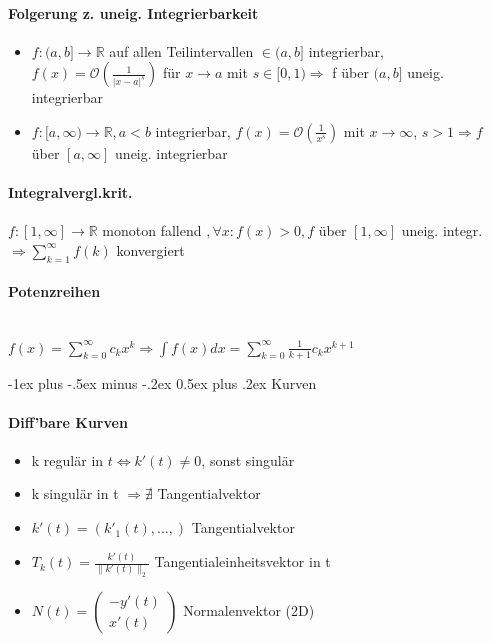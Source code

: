\documentclass[paper=a3,paper=landscape, fontsize=9pt, DIV=30]{scrartcl}
\makeatletter
\newcommand{\real}{{\mathbb{R}}}
\newcommand{\laO}{\mathcal{O}}
\renewcommand{\section}{\@startsection{section}{1}{0mm}%
  {-1ex plus -.5ex minus -.2ex}%
  {0.5ex plus .2ex}%
  {\color{blue}\normalfont\large\bfseries}}
\makeatother
\begin{document}
\begin{multicols*}{4}
	\paragraph{Folgerung z. uneig. Integrierbarkeit}
	\begin{itemize}
		\item $f: (a,b] \rightarrow \real$ auf allen Teilintervallen $\in (a,b]$ integrierbar, $f(x)=\laO(\frac{1}{\lvert x-a \rvert ^s})$ für $x \rightarrow a$ mit $s \in [0,1) \Rightarrow$ f über $(a,b]$ uneig. integrierbar
		\item $f: [a,\infty) \rightarrow \real, a<b$ integrierbar, $f(x)=\laO(\frac{1}{x^s})$ mit $x \rightarrow \infty$, $s > 1 \Rightarrow f$ über $[a,\infty]$ uneig. integrierbar
	\end{itemize}


  \paragraph{Integralvergl.krit.}
  $f:[1,\infty]\rightarrow\real$ monoton fallend $, \forall x: f(x)>0, f$ über $[1,\infty]$ uneig. integr. $\Rightarrow \sum_{k=1}^{\infty}f(k)$ konvergiert


  \paragraph{Potenzreihen}\hspace{0pt} \\
  $f(x)=\sum_{k=0}^{\infty}c_kx^k \Rightarrow \int f(x)dx=\sum_{k=0}^{\infty}\frac{1}{k+1}c_kx^{k+1}$



  \section{Kurven}
  \paragraph{Diff'bare Kurven}
  \begin{itemize}
  \item k regulär in $t \Leftrightarrow k'(t) \neq 0$, sonst singulär
  \item k singulär in t $\Rightarrow \nexists$ Tangentialvektor
  \item $k'(t)=(k'_1(t),...,)$ Tangentialvektor
  \item $T_k(t)=\frac{k'(t)}{\lVert k'(t)\rVert_2}$ Tangentialeinheitsvektor in t
  \item $N(t)=\begin{pmatrix}
  -y'(t)\\x'(t)
  \end{pmatrix}$ Normalenvektor (2D)
  \end{itemize}



\end{multicols*}
\end{document}
